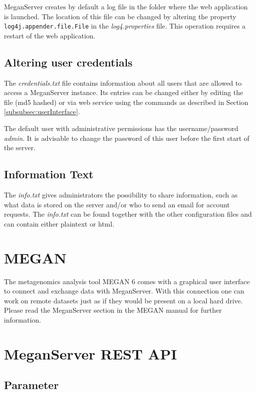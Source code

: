 \documentclass[11pt]{article}
\begin{document}
MeganServer creates by default a log file in the folder where the web application is launched. The location of this file can be changed by altering the property \texttt{log4j.appender.file.File} in the \textit{log4.properties} file. This operation requires a restart of the web application.

\subsection{Altering user credentials}

The \textit{credentials.txt} file contains information about all users that are allowed to access a MeganServer instance. Its entries can be changed either by editing the file (md5 hashed) or via web service using the commands as described in Section \ref{subsubsec:userInterface}.

The default user with administrative permissions has the username/password \textit{admin}. It is advisable to change the password of this user before the first start of the server.




\subsection{Information Text}

The \textit{info.txt} gives administrators the possibility to share information, such as what data is stored on the server and/or who to send an email for account requests. The \textit{info.txt} can be found together with the other configuration files and can contain either plaintext or html.

\section{MEGAN}

The metagenomics analysis tool MEGAN 6 comes with a graphical user interface to connect and exchange data with MeganServer. With this connection one can work on remote datasets just as if they would be present on a local hard drive. Please read the MeganServer section in the MEGAN manual for further information.


\section{MeganServer REST API}
\subsection{Parameter}
\end{document}
